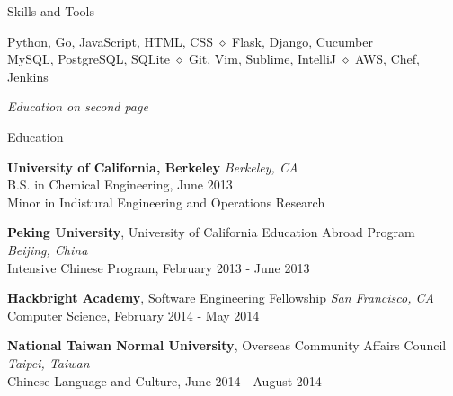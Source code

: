 \documentclass{resume} %
\begin{document}
\begin{rSection}{Skills and Tools}

Python, Go, JavaScript, HTML, CSS \enspace $\diamond$ \enspace Flask, Django, Cucumber \\
MySQL, PostgreSQL, SQLite \enspace $\diamond$ \enspace Git, Vim, Sublime, IntelliJ \enspace $\diamond$ \enspace AWS, Chef, Jenkins \smallskip

{\em Education on second page}



\end{rSection}


\begin{rSection}{Education}

{\bf University of California, Berkeley} \hfill {\em Berkeley, CA} \\
B.S. in Chemical Engineering, June 2013 \\
Minor in Indistural Engineering and Operations Research \smallskip

{\bf Peking University}, University of California Education Abroad Program \hfill {\em Beijing, China} \\
Intensive Chinese Program, February 2013 - June 2013 \smallskip

{\bf Hackbright Academy}, Software Engineering Fellowship \hfill {\em San Francisco, CA} \\
Computer Science, February 2014 - May 2014 \smallskip

{\bf National Taiwan Normal University}, Overseas Community Affairs Council \hfill {\em Taipei, Taiwan} \\
Chinese Language and Culture, June 2014 - August 2014 \smallskip \\

\end{rSection}
\end{document}

